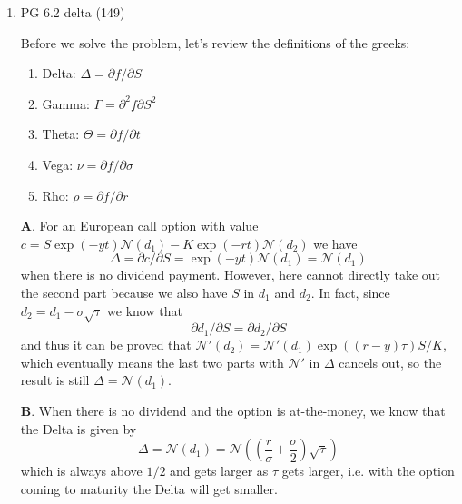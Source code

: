 \documentclass[11pt]{article}
\newcommand{\E}{\text{E}}
\newcommand{\bs}{\boldsymbol}
\renewcommand{\d}{\text{d}}
\newenvironment{note}{\begin{enumerate}[leftmargin=1em,topsep=0pt,noitemsep]}{\end{enumerate}}
\newenvironment{nnote}{\begin{enumerate}[leftmargin=.95em,topsep=0pt,noitemsep,label=$\bs{\cdot}$]}{\end{enumerate}}
\newcommand{\solution}{\boxed{\textbf{SOLUTION}}\hspace{.5em}}
\begin{document}
\begin{spacing}{1.1}
\begin{note}
\textbf{C}. Skipped.

\textbf{D}. The option should value \$$1/H$ because whenever a \$$1$-stock hits \$$H$ it pays \$$1$. By no arbitrage assumption we know it must worth $1/H$ of the stock value.      

\textbf{E}. Assume $S\sim\text{GBM}(r, \sigma^2)$, then the derivative has payoff $f(S) = 1/S$ and thus by Ito's lemma we have
$$
\d f = \left(\frac{\partial f}{\partial t} + \frac{\partial f}{\partial S}r S + \frac{\partial^2 f}{\partial S^2}\frac{\sigma^2 S^2}{2}\right)\d t + \frac{\partial f}{\partial S}\sigma S\d w = (\sigma^2 - r)f \d t - \sigma f \d w
$$
and thus
$$
\ln f = \left(\frac{\sigma^2}{2} - r\right)\d t - \sigma\d w.
$$
Therefore, we have 
$$
\ln f(T) = \ln f(t) + \mathcal{N}((\sigma^2/2 - r)\tau, \sigma^2\tau)
$$
and thus we know $\E[f(T)] = \E[\exp(\ln f(T))] = \exp(\sigma^2 \tau  - r \tau) / S_T$. Discount this value using risk-free interest rate $r$ and we have $V = \exp(\sigma^2\tau -2r\tau) / S$.
\item PG 6.2 delta (149)

\solution Before we solve the problem, let's review the definitions of the greeks:
\begin{nnote}
\item Delta: $\Delta = \partial f / \partial S$
\item Gamma: $\Gamma = \partial^2 f \partial S^2$
\item Theta: $\Theta = \partial f / \partial t$
\item Vega: $\nu = \partial f / \partial \sigma$
\item Rho: $\rho = \partial f / \partial r$
\end{nnote}
\textbf{A}. For an European call option with value $c = S\exp(-yt)\mathcal{N}(d_1) - K\exp(-rt)\mathcal{N}(d_2)$ we have
$$
\Delta = \partial c / \partial S = \exp(-yt)\mathcal{N}(d_1) = \mathcal{N}(d_1)
$$
when there is no dividend payment. However, here cannot directly take out the second part because we also have $S$ in $d_1$ and $d_2$. In fact, since $d_2 = d_1 -\sigma\sqrt{\tau}$ we know that
$$
\partial d_1 / \partial S = \partial d_2 / \partial S
$$
and thus it can be proved that $\mathcal{N}'(d_2) = \mathcal{N}'(d_1)\exp((r-y)\tau)S / K$, which eventually means the last two parts with $\mathcal{N}'$ in $\Delta$ cancels out, so the result is still $\Delta = \mathcal{N}(d_1)$.

\textbf{B}. When there is no dividend and the option is at-the-money, we know that the Delta is given by
$$
\Delta = \mathcal{N}(d_1) = \mathcal{N}\left(\left(\frac{r}{\sigma} + \frac{\sigma}{2}\right)\sqrt{\tau}\right)
$$
which is always above $1/2$ and gets larger as $\tau$ gets larger, i.e. with the option coming to maturity the Delta will get smaller.


\end{note}
\end{spacing}
\end{document}
